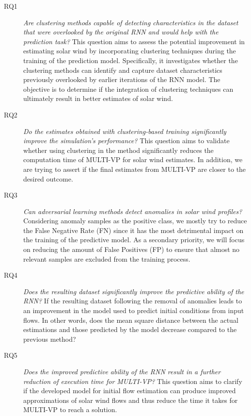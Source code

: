 \begin{description}
    \item[RQ1] \textit{Are clustering methods capable of detecting characteristics in the dataset that were overlooked by the original RNN and would help with the prediction task?}
     This question aims to assess the potential improvement in estimating solar wind by incorporating clustering techniques during the training of the prediction model. Specifically, it investigates whether the clustering methods can identify and capture dataset characteristics previously overlooked by earlier iterations of the RNN model. The objective is to determine if the integration of clustering techniques can ultimately result in better estimates of solar wind.

    \item[RQ2] \textit{Do the estimates obtained with clustering-based training significantly improve the simulation's performance?} This question aims to validate whether using clustering in the method significantly reduces the computation time of MULTI-VP for solar wind estimates. In addition, we are trying to assert if the final estimates from MULTI-VP are closer to the desired outcome.
    
    \item[RQ3] \textit{Can adversarial learning methods detect anomalies in solar wind profiles?} Considering anomaly samples as the positive class, we mostly try to reduce the False Negative Rate (FN) since it has the most detrimental impact on the training of the predictive model. As a secondary priority, we will focus on reducing the amount of False Positives (FP) to ensure that almost no relevant samples are excluded from the training process.
    
    \item[RQ4] \textit{Does the resulting dataset significantly improve the predictive ability of the RNN?} If the resulting dataset following the removal of anomalies leads to an improvement in the model used to predict initial conditions from input flows. In other words, does the mean square distance between the actual estimations and those predicted by the model decrease compared to the previous method?
    \item[RQ5] \textit{Does the improved predictive ability of the RNN result in a further reduction of execution time for MULTI-VP?} This question aims to clarify if the developed model for initial flow estimation can produce improved approximations of solar wind flows and thus reduce the time it takes for MULTI-VP to reach a solution.
\end{description}




